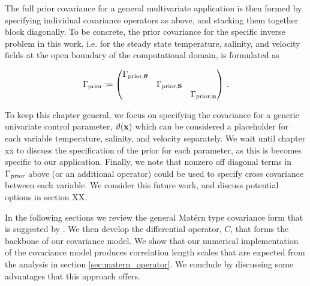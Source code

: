 The full prior covariance for a general multivariate application is then formed
by specifying individual covariance operators as above, and stacking them
together block diagonally.
To be concrete, the prior covariance for the specific inverse problem in this
work, i.e. for the steady state temperature, salinity,
and velocity fields at the open boundary of the computational domain,
is formulated as
\begin{linenomath*}\begin{equation*}
    \Gamma_{\text{prior}} \coloneqq
    \begin{pmatrix}
        \Gamma_{\text{prior,}{\bm{\theta}}} & & \\
        & \Gamma_{\text{prior,}\mathbf{S}} & \\
        & & \Gamma_{\text{prior,}\mathbf{u}} \\
    \end{pmatrix} \, .
\end{equation*}\end{linenomath*}
To keep this chapter general, we focus on specifying the covariance for a generic
univariate control parameter, $\vartheta(\mathbf{x})$ which can be considered a placeholder
for each variable temperature, salinity, and velocity separately.
We wait until
chapter xx to discuss the specification of the prior
for each parameter, as this is becomes specific to our application.
Finally, we note that nonzero off diagonal terms in $\Gamma_{\text{prior}}$ above (or an
additional operator) could be used to specify cross covariance between each
variable.
We consider this future work, and discuss potential options in
section XX.

In the following sections we review the general Mat\'ern type covariance
form that is suggested by \citet{RSSB:RSSB777}.
We then develop the differential operator, $C$, that
forms the backbone of our covariance model.
We show that our numerical implementation of the covariance model produces correlation
length scales that are expected from the analysis in section
\ref{sec:matern_operator}.
We conclude by discussing some advantages that this approach offers.
